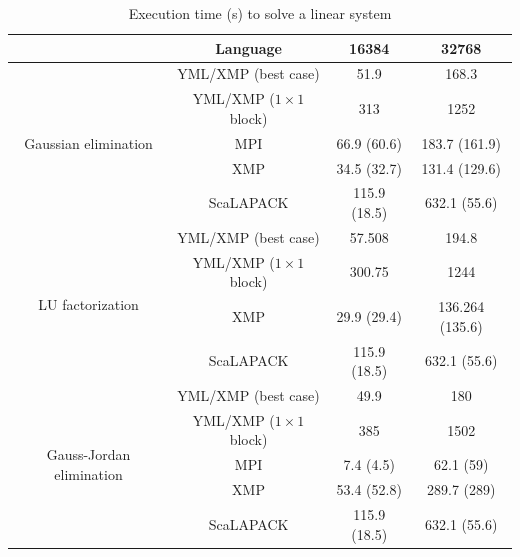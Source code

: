 \begin{table}[h]
	\caption{Execution time (s) to solve a linear system\label{tab:best_time_poincare}}
	\centering
	\begin{tabular}{cccc}
		                                          &           Language           &    16384     &      32768      \\ \hline
		  \multirow{5}{*}{Gaussian elimination}   &     YML/XMP (best case)      &     51.9     &      168.3      \\
		                                          & YML/XMP ($1 \times 1$ block) &     313      &      1252       \\
		                                          &             MPI              & 66.9 (60.6)  &  183.7 (161.9)  \\
		                                          &             XMP              & 34.5 (32.7)  &  131.4 (129.6)  \\
		                                          &          ScaLAPACK           & 115.9 (18.5) &  632.1 (55.6)   \\ \hline
		    \multirow{4}{*}{LU factorization}     &     YML/XMP (best case)      &    57.508    &      194.8      \\
		                                          & YML/XMP ($1 \times 1$ block) &    300.75    &      1244       \\
		                                          &             XMP              & 29.9 (29.4)  & 136.264 (135.6) \\
		                                          &          ScaLAPACK           & 115.9 (18.5) &  632.1 (55.6)   \\ \hline
		\multirow{5}{*}{Gauss-Jordan elimination} &     YML/XMP (best case)      &     49.9     &       180       \\
		                                          & YML/XMP ($1 \times 1$ block) &     385      &      1502       \\
		                                          &             MPI              &  7.4 (4.5)   &    62.1 (59)    \\
		                                          &             XMP              & 53.4 (52.8)  &   289.7 (289)   \\
		                                          &          ScaLAPACK           & 115.9 (18.5) &  632.1 (55.6)
	\end{tabular}
\end{table}

